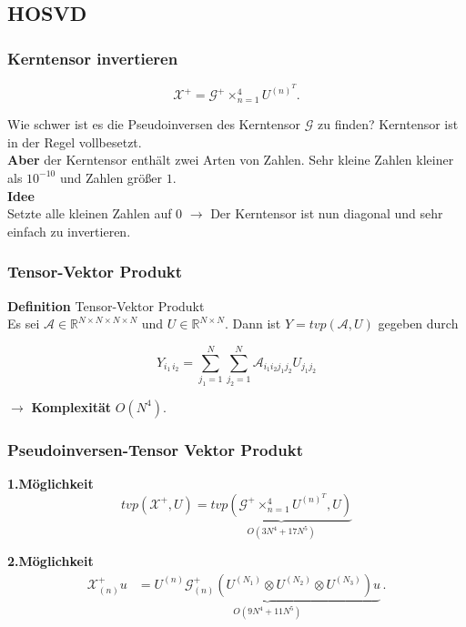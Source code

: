 \subsection{HOSVD}

\begin{frame}
\frametitle{Kerntensor invertieren}
\begin{framed}
\begin{equation*}
\pmb{\mathcal{X}}^{+} = \pmb{\mathcal{G}}^{+} \times_{n=1}^{4} U^{ (n) ^{T} }.
\end{equation*}
\end{framed}

Wie schwer ist es die Pseudoinversen des Kerntensor $\mathcal{G}$ zu finden?
Kerntensor ist in der Regel vollbesetzt. \\ \textbf{Aber} der Kerntensor enthält zwei Arten von Zahlen. Sehr kleine Zahlen kleiner als $10^{-10}$ und Zahlen größer $1$. \\
\textbf{Idee} \\
Setzte alle kleinen Zahlen auf 0 $\rightarrow$ Der Kerntensor ist nun diagonal und sehr einfach zu invertieren.

\end{frame}

\begin{frame}
\frametitle{Tensor-Vektor Produkt}
\begin{framed}
\textbf{Definition} Tensor-Vektor Produkt \\
Es sei $\mathcal{A} \in \mathbb{R}^{N \times N \times N \times N}$ und $U \in \mathbb{R}^{N \times N}$.
Dann ist $Y=tvp(\mathcal{A},U)$ gegeben durch


\begin{equation*}
Y_{i_1 \, i_2} = \sum\limits_{j_1=1}^{N} \sum\limits_{j_2=1}^{N} \mathcal{A}_{i_1 i_2 j_1 j_2} U_{j_1 j_2}
\end{equation*}

\end{framed}

$\rightarrow$ \textbf{Komplexität} $O(N^4)$.

\end{frame}

\begin{frame}
\frametitle{Pseudoinversen-Tensor Vektor Produkt}
\textbf{1.Möglichkeit}
\begin{equation*} \label{eq:pinv}
tvp(\mathcal{X}^{+},U) = \underbrace{tvp(\mathcal{G}^{+} \times_{n=1}^{4} U^{ (n) ^{T} },U)}_{O(3N^4+17N^5)}
\end{equation*} 


\textbf{2.Möglichkeit}
\begin{equation*} \label{eq:pinvcase}
\begin{aligned}
\mathcal{X}^{+}_{(n)} u&= \underbrace{U^{ (n) }  \mathcal{G}^{+}_{(n)} ( U^{ (N_{1})  } \otimes U^{ (N_{2}) }  \otimes U^{ (N_{3}) }) u}_{O(9N^4+11N^5)} \,.
\end{aligned}
\end{equation*}

\end{frame}

